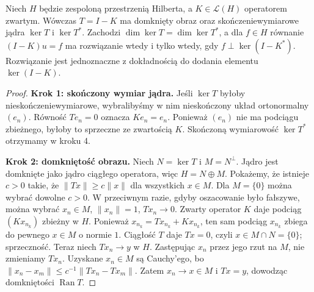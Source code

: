 \begin{twierdzenie}
\label{thm:pde12-general-fredholm}
Niech $H$ będzie zespoloną przestrzenią Hilberta,
a $K\in\mathcal L(H)$ operatorem zwartym. Wówczas
$T=I-K$ ma domknięty obraz oraz skończeniewymiarowe
jądra $\ker T$ i $\ker T^*$. Zachodzi
$\dim\ker T=\dim\ker T^*$, a dla $f\in H$
równanie $(I-K)u=f$ ma rozwiązanie wtedy i tylko wtedy,
gdy $f\perp\ker(I-K^*)$. Rozwiązanie jest jednoznaczne
z dokładnością do dodania elementu $\ker(I-K)$.
\end{twierdzenie}
\begin{proof}
\textbf{Krok 1: skończony wymiar jądra.}
Jeśli $\ker T$ byłoby nieskończeniewymiarowe,
wybralibyśmy w nim nieskończony układ ortonormalny
$(e_n)$. Równość $Te_n=0$ oznacza $Ke_n=e_n$.
Ponieważ $(e_n)$ nie ma podciągu zbieżnego, byłoby
to sprzeczne ze zwartością $K$. Skończoną wymiarowość
$\ker T^*$ otrzymamy w kroku 4.

\textbf{Krok 2: domkniętość obrazu.} Niech
$N=\ker T$ i $M=N^\perp$. Jądro jest domknięte
jako jądro ciągłego operatora, więc $H=N\oplus M$.
Pokażemy, że istnieje $c>0$
takie, że $\|Tx\|\ge c\|x\|$ dla wszystkich $x\in M$.
Dla $M=\{0\}$ można wybrać dowolne $c>0$.
W przeciwnym razie, gdyby oszacowanie było fałszywe, można wybrać $x_n\in M$,
$\|x_n\|=1$, $Tx_n\to0$. Zwarty operator $K$
daje podciąg $(Kx_{n_k})$ zbieżny w $H$.
Ponieważ $x_{n_k}=Tx_{n_k}+Kx_{n_k}$,
ten sam podciąg $x_{n_k}$ zbiega do pewnego $x\in M$
o normie $1$. Ciągłość $T$ daje $Tx=0$,
czyli $x\in M\cap N=\{0\}$; sprzeczność.
Teraz niech $Tx_n\to y$ w $H$.
Zastępując $x_n$ przez jego rzut na $M$, nie zmieniamy
$Tx_n$. Uzyskane $x_n\in M$ są Cauchy'ego,
bo $\|x_n-x_m\|\le c^{-1}\|Tx_n-Tx_m\|$.
Zatem $x_n\to x\in M$ i $Tx=y$, dowodząc domkniętości
$\operatorname{Ran}T$.


\end{proof}
